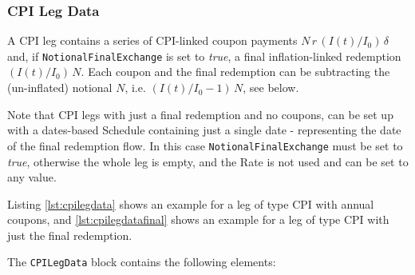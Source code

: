 \subsubsection{CPI Leg Data}
\label{ss:cpilegdata}

A CPI leg contains a series of CPI-linked coupon payments $N\,r\,({I(t)}/{I_0})\,\delta$ and, if \lstinline!NotionalFinalExchange! is set to \emph{true}, a final
inflation-linked redemption $(I(t)/I_0)\,N$. Each coupon and the final redemption can be
subtracting the (un-inflated) notional $N$, i.e. $(I(t)/I_0-1)\,N$,
see below.

Note that CPI legs with just a final redemption and no coupons, can be set up with a dates-based Schedule containing just a single date - representing the date of the final redemption flow. In this case \lstinline!NotionalFinalExchange! must be set to \emph{true}, otherwise the whole leg is empty, and the Rate is not used and can be set to any value.

Listing \ref{lst:cpilegdata} shows an example for a leg of type CPI with annual coupons, and \ref{lst:cpilegdatafinal} shows an example for a leg of type CPI with just the final redemption.

The  \lstinline!CPILegData! block contains the following elements:

